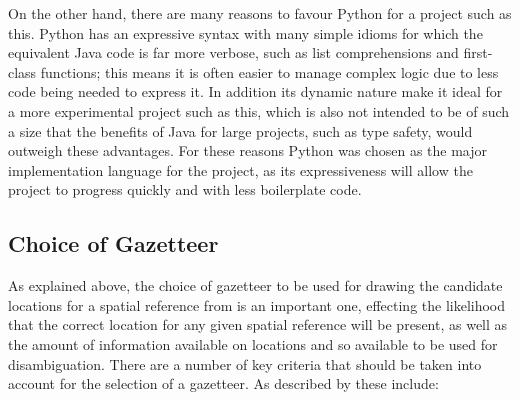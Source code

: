 \documentclass[12pt, a4paper]{report}
\begin{document}
On the other hand, there are many reasons to favour Python for a project such as this. Python has an expressive syntax with many simple idioms for which the equivalent Java code is far more verbose, such as list comprehensions and first-class functions; this means it is often easier to manage complex logic due to less code being needed to express it. In addition its dynamic nature make it ideal for a more experimental project such as this, which is also not intended to be of such a size that the benefits of Java for large projects, such as type safety, would outweigh these advantages. For these reasons Python was chosen as the major implementation language for the project, as its expressiveness will allow the project to progress quickly and with less boilerplate code. 

\subsection{Choice of Gazetteer}
\label{subsec_gazetteer}


As explained above, the choice of gazetteer to be used for drawing the candidate locations for a spatial reference from is an important one, effecting the likelihood that the correct location for any given spatial reference will be present, as well as the amount of information available on locations and so available to be used for disambiguation. There are a number of key criteria that should be taken into account for the selection of a gazetteer. As described by \citet{leidner2004} these include:

\end{document}

